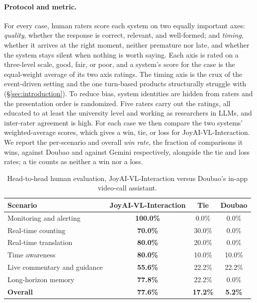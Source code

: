 \paragraph{\textbf{Protocol and metric.}} For every case, human raters score each system on two equally important axes: \textit{quality}, whether the response is correct, relevant, and well-formed; and \textit{timing}, whether it arrives at the right moment, neither premature nor late, and whether the system stays silent when nothing is worth saying. Each axis is rated on a three-level scale, good, fair, or poor, and a system's score for the case is the equal-weight average of its two axis ratings. The timing axis is the crux of the event-driven setting and the one turn-based products structurally struggle with (\S\ref{sec:introduction}). To reduce bias, system identities are hidden from raters and the presentation order is randomized. Five raters carry out the ratings, all educated to at least the university level and working as researchers in LLMs, and inter-rater agreement is high. For each case we then compare the two systems' weighted-average scores, which gives a win, tie, or loss for JoyAI-VL-Interaction. We report the per-scenario and overall \textit{win rate}, the fraction of comparisons it wins, against Doubao and against Gemini respectively, alongside the tie and loss rates; a tie counts as neither a win nor a loss.



\begin{table}[h]
\centering
\renewcommand{\arraystretch}{1.3}
\begin{tabular}{lccc}
\toprule
\textbf{Scenario} & \textbf{JoyAI-VL-Interaction} & \textbf{Tie} & \textbf{Doubao} \\
\midrule
Monitoring and alerting      & \textbf{100.0\%} & 0.0\%  & 0.0\%  \\
Real-time counting                & \textbf{70.0\%}  & 30.0\% & 0.0\%  \\
Real-time translation        & \textbf{80.0\%}  & 20.0\% & 0.0\%  \\
Time awareness               & \textbf{80.0\%}  & 10.0\% & 10.0\% \\
Live commentary and guidance & \textbf{55.6\%}  & 22.2\% & 22.2\% \\
Long-horizon memory          & \textbf{77.8\%}  & 22.2\% & 0.0\%  \\
\midrule
\textbf{Overall}             & \textbf{77.6\%}  & \textbf{17.2\%} & \textbf{5.2\%} \\
\bottomrule
\end{tabular}
\caption{Head-to-head human evaluation, JoyAI-VL-Interaction versus Doubao's in-app video-call assistant.}
\end{table}


